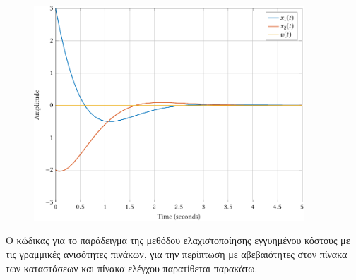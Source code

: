 \begin{figure}[h]
    \centering
    \includegraphics[width=0.9\textwidth]{figures/gcc_lmi3.pdf}
    \label{fig:gcc_lmi3}
\end{figure}

Ο κώδικας για το παράδειγμα της μεθόδου ελαχιστοποίησης εγγυημένου κόστους
με τις γραμμικές ανισότητες πινάκων, για την περίπτωση με αβεβαιότητες στον
πίνακα των καταστάσεων και πίνακα ελέγχου παρατίθεται παρακάτω.
\eng{}
